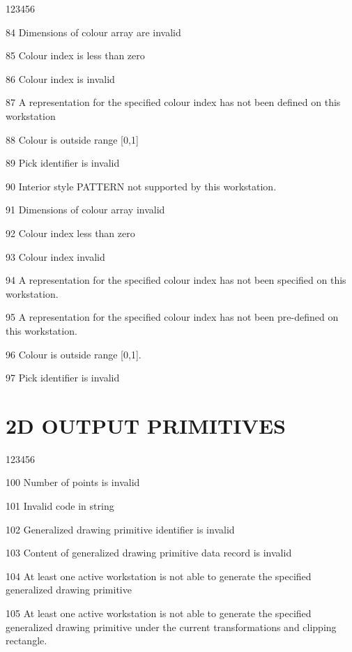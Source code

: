 \begin{DLtt}{123456}
\item[84]
Dimensions of colour array are invalid
\item[85]
Colour index is less than zero
\item[86]
Colour index is invalid
\item[87]
A representation for the specified colour index has not been defined
on this workstation
\item[88]
Colour is outside range [0,1]
\item[89]
Pick identifier is invalid
\item[90]
Interior style PATTERN not supported by this workstation.
\item[91]
Dimensions of colour array invalid
\item[92]
Colour index less than zero
\item[93]
Colour index invalid
\item[94]
A representation for the specified colour index has not been
specified on this workstation.
\item[95]
A representation for the specified colour index has not been
pre-defined on this workstation.
\item[96]
Colour is outside range [0,1].
\item[97]
Pick identifier is invalid
\end{DLtt}
\section{2D OUTPUT PRIMITIVES}
\begin{DLtt}{123456}
\item[100]
Number of points is invalid
\item[101]
Invalid code in string
\item[102]
Generalized drawing primitive identifier is invalid
\item[103]
Content of generalized drawing primitive data record is invalid
\item[104]
At least one active workstation is not able to generate the specified
generalized drawing primitive
\item[105]
At least one active workstation is not able to generate the specified
generalized drawing primitive under the current transformations and
clipping rectangle.
\end{DLtt}
